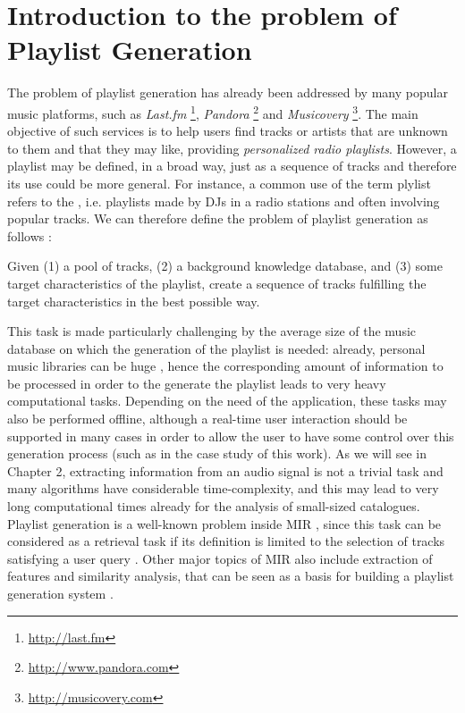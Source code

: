 \section{Introduction to the problem of Playlist Generation}
The problem of playlist generation has already been addressed by many popular music platforms, such as \textit{Last.fm} \footnote{\url{http://last.fm}}, \textit{Pandora} \footnote{\url{http://www.pandora.com}} and \textit{Musicovery} \footnote{\url{http://musicovery.com}}. The main objective of such services is to help users find tracks or artists that are unknown to them and that they may like, providing \textit{personalized radio playlists}. However, a playlist may be defined, in a broad way, just as a sequence of tracks \cite{bonnin14} and therefore its use could be more general. For instance, a common use of the term plylist refers to the , i.e. playlists made by DJs in a radio stations and often involving popular tracks. We can therefore define the problem of playlist generation as follows \cite{bonnin14}:

\begin{displayquote}
Given (1) a pool of tracks, (2) a background knowledge database, and (3) some target characteristics of the playlist, create a sequence of tracks fulfilling the target characteristics in the best possible way.
\end{displayquote}

This task is made particularly challenging by the average size of the music database on which the generation of the playlist is needed: already, personal music libraries can be huge \cite{dias10}, hence the corresponding amount of information to be processed in order to the generate the playlist leads to very heavy computational tasks. Depending on the need of the application, these tasks may also be performed offline, although a real-time user interaction should be supported in many cases in order to allow the user to have some control over this generation process (such as in the case study of this work). As we will see in Chapter 2, extracting information from an audio signal is not a trivial task and many algorithms have considerable time-complexity, and this may lead to very long computational times already for the analysis of small-sized catalogues. Playlist generation is a well-known problem inside MIR \cite{downey03} \cite{grachten09}, since this task can be considered as a retrieval task if its definition is limited to the selection of tracks satisfying a user query \cite{bonnin14}. Other major topics of MIR also include extraction of features and similarity analysis, that can be seen as a basis for building a playlist generation system \cite{dopler08}. 


